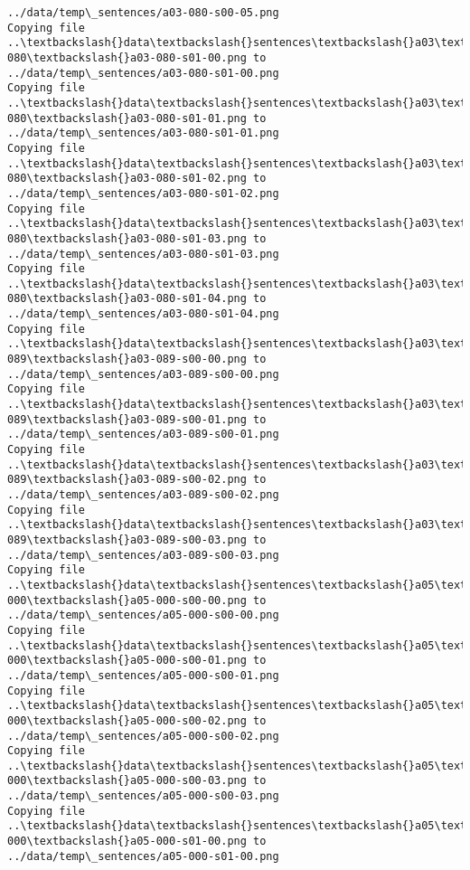 \documentclass[11pt]{article}
\begin{document}
\begin{Verbatim}[commandchars=\\\{\}]
../data/temp\_sentences/a03-080-s00-05.png
Copying file ..\textbackslash{}data\textbackslash{}sentences\textbackslash{}a03\textbackslash{}a03-080\textbackslash{}a03-080-s01-00.png to
../data/temp\_sentences/a03-080-s01-00.png
Copying file ..\textbackslash{}data\textbackslash{}sentences\textbackslash{}a03\textbackslash{}a03-080\textbackslash{}a03-080-s01-01.png to
../data/temp\_sentences/a03-080-s01-01.png
Copying file ..\textbackslash{}data\textbackslash{}sentences\textbackslash{}a03\textbackslash{}a03-080\textbackslash{}a03-080-s01-02.png to
../data/temp\_sentences/a03-080-s01-02.png
Copying file ..\textbackslash{}data\textbackslash{}sentences\textbackslash{}a03\textbackslash{}a03-080\textbackslash{}a03-080-s01-03.png to
../data/temp\_sentences/a03-080-s01-03.png
Copying file ..\textbackslash{}data\textbackslash{}sentences\textbackslash{}a03\textbackslash{}a03-080\textbackslash{}a03-080-s01-04.png to
../data/temp\_sentences/a03-080-s01-04.png
Copying file ..\textbackslash{}data\textbackslash{}sentences\textbackslash{}a03\textbackslash{}a03-089\textbackslash{}a03-089-s00-00.png to
../data/temp\_sentences/a03-089-s00-00.png
Copying file ..\textbackslash{}data\textbackslash{}sentences\textbackslash{}a03\textbackslash{}a03-089\textbackslash{}a03-089-s00-01.png to
../data/temp\_sentences/a03-089-s00-01.png
Copying file ..\textbackslash{}data\textbackslash{}sentences\textbackslash{}a03\textbackslash{}a03-089\textbackslash{}a03-089-s00-02.png to
../data/temp\_sentences/a03-089-s00-02.png
Copying file ..\textbackslash{}data\textbackslash{}sentences\textbackslash{}a03\textbackslash{}a03-089\textbackslash{}a03-089-s00-03.png to
../data/temp\_sentences/a03-089-s00-03.png
Copying file ..\textbackslash{}data\textbackslash{}sentences\textbackslash{}a05\textbackslash{}a05-000\textbackslash{}a05-000-s00-00.png to
../data/temp\_sentences/a05-000-s00-00.png
Copying file ..\textbackslash{}data\textbackslash{}sentences\textbackslash{}a05\textbackslash{}a05-000\textbackslash{}a05-000-s00-01.png to
../data/temp\_sentences/a05-000-s00-01.png
Copying file ..\textbackslash{}data\textbackslash{}sentences\textbackslash{}a05\textbackslash{}a05-000\textbackslash{}a05-000-s00-02.png to
../data/temp\_sentences/a05-000-s00-02.png
Copying file ..\textbackslash{}data\textbackslash{}sentences\textbackslash{}a05\textbackslash{}a05-000\textbackslash{}a05-000-s00-03.png to
../data/temp\_sentences/a05-000-s00-03.png
Copying file ..\textbackslash{}data\textbackslash{}sentences\textbackslash{}a05\textbackslash{}a05-000\textbackslash{}a05-000-s01-00.png to
../data/temp\_sentences/a05-000-s01-00.png

\end{Verbatim}
\end{document}
